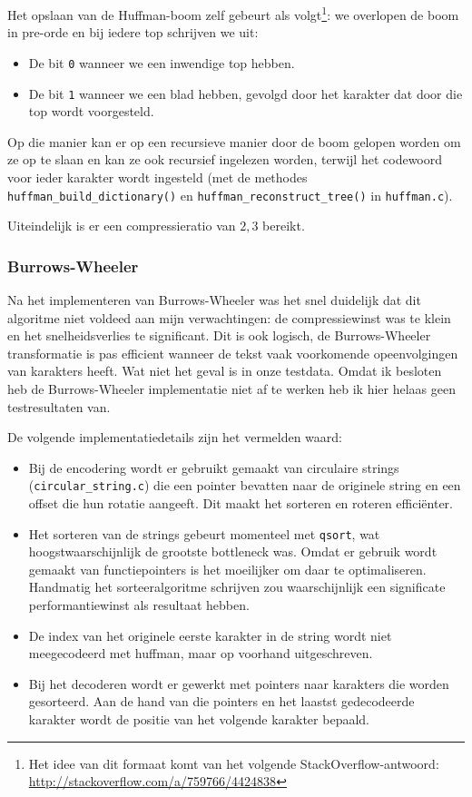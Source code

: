 \documentclass[a4paper]{article}
\begin{document}
Het opslaan van de Huffman-boom zelf gebeurt als volgt\footnote{Het idee van dit formaat komt van het volgende StackOverflow-antwoord: \url{http://stackoverflow.com/a/759766/4424838}}: we overlopen de boom in pre-orde en bij iedere top schrijven we uit:
\begin{itemize}[topsep=0pt]
    \item De bit \texttt{0} wanneer we een inwendige top hebben.
    \item De bit \texttt{1} wanneer we een blad hebben, gevolgd door het karakter dat door die top wordt voorgesteld.
\end{itemize}
Op die manier kan er op een recursieve manier door de boom gelopen worden om ze op te slaan en kan ze ook recursief ingelezen worden, terwijl het codewoord voor ieder karakter wordt ingesteld (met de methodes \texttt{huffman\_build\_dictionary()} en \texttt{huffman\_reconstruct\_tree()} in \texttt{huffman.c}).

Uiteindelijk is er een compressieratio van $2,3$ bereikt.


\subsubsection{Burrows-Wheeler}

Na het implementeren van Burrows-Wheeler was het snel duidelijk dat dit algoritme niet voldeed aan mijn verwachtingen: de compressiewinst was te klein en het snelheidsverlies te significant. Dit is ook logisch, de Burrows-Wheeler transformatie is pas efficient wanneer de tekst vaak voorkomende opeenvolgingen van karakters heeft. Wat niet het geval is in onze testdata. Omdat ik besloten heb de Burrows-Wheeler implementatie niet af te werken heb ik hier helaas geen testresultaten van.

De volgende implementatiedetails zijn het vermelden waard:
\begin{itemize}
    \item Bij de encodering wordt er gebruikt gemaakt van circulaire strings (\texttt{circular\_string.c}) die een pointer bevatten naar de originele string en een offset die hun rotatie aangeeft. Dit maakt het sorteren en roteren efficiënter.
    \item Het sorteren van de strings gebeurt momenteel met \texttt{qsort}, wat hoogstwaarschijnlijk de grootste bottleneck was. Omdat er gebruik wordt gemaakt van functiepointers is het moeilijker om daar te optimaliseren. Handmatig het sorteeralgoritme schrijven zou waarschijnlijk een significate performantiewinst als resultaat hebben.
    \item De index van het originele eerste karakter in de string wordt niet meegecodeerd met huffman, maar op voorhand uitgeschreven.
    \item Bij het decoderen wordt er gewerkt met pointers naar karakters die worden gesorteerd. Aan de hand van die pointers en het laastst gedecodeerde karakter wordt de positie van het volgende karakter bepaald.
\end{itemize}
\end{document}
